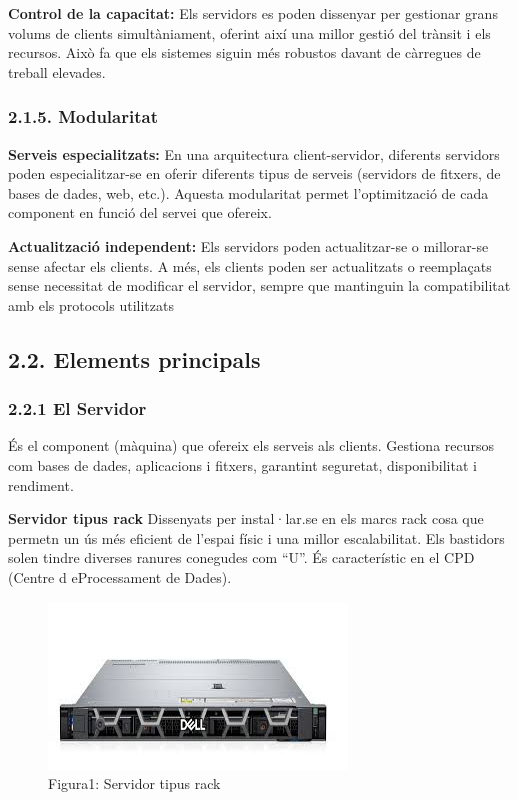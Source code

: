 \documentclass[
  a4paper,
]{article}
\begin{document}
\textbf{Control de la capacitat:} Els servidors es poden dissenyar per
gestionar grans volums de clients simultàniament, oferint així una
millor gestió del trànsit i els recursos. Això fa que els sistemes
siguin més robustos davant de càrregues de treball elevades.

\subsubsection{2.1.5. Modularitat}\label{modularitat}

\textbf{Serveis especialitzats:} En una arquitectura client-servidor,
diferents servidors poden especialitzar-se en oferir diferents tipus de
serveis (servidors de fitxers, de bases de dades, web, etc.). Aquesta
modularitat permet l'optimització de cada component en funció del servei
que ofereix.

\textbf{Actualització independent:} Els servidors poden actualitzar-se o
millorar-se sense afectar els clients. A més, els clients poden ser
actualitzats o reemplaçats sense necessitat de modificar el servidor,
sempre que mantinguin la compatibilitat amb els protocols utilitzats

\subsection{2.2. Elements principals}\label{elements-principals}

\subsubsection{2.2.1 El Servidor}\label{el-servidor}

És el component (màquina) que ofereix els serveis als clients. Gestiona
recursos com bases de dades, aplicacions i fitxers, garantint seguretat,
disponibilitat i rendiment.

\textbf{Servidor tipus rack} Dissenyats per instal·lar.se en els marcs
rack cosa que permetn un ús més eficient de l'espai físic i una millor
escalabilitat. Els bastidors solen tindre diverses ranures conegudes com
``U''. És característic en el CPD (Centre d eProcessament de Dades).

\begin{figure}
\centering
\includegraphics{png/servidorRack.jpeg}
\caption{Figura1: Servidor tipus rack}
\end{figure}
\end{document}

